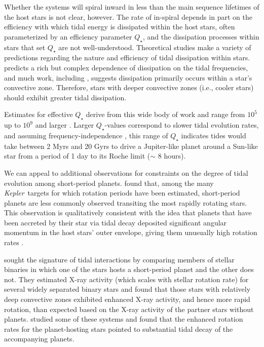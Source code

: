 \documentclass{svjour3}                     %
\newcommand{\kepler}{\emph{Kepler}}
\begin{document}
Whether the systems will spiral inward in less than the main sequence lifetimes of the host stars is not clear, however. The rate of in-spiral depends in part on the efficiency with which tidal energy is dissipated within the host stars, often parameterized by an efficiency parameter $Q_\star$, and the dissipation processes within stars that set $Q_\star$ are not well-understood. Theoretical studies make a variety of predictions regarding the nature and efficiency of tidal dissipation within stars. \cite{2016ApJ...816...18E} predicts a rich but complex dependence of dissipation on the tidal frequencies, and much work, including \cite{2007ApJ...655.1166P}, suggests dissipation primarily occurs within a star's convective zone. Therefore, stars with deeper convective zones (i.e., cooler stars) should exhibit greater tidal dissipation. 

Estimates for effective $Q_\star$ derive from this wide body of work and range from $10^5$ \cite{1996Natur.380..606L,2016ApJ...816...18E} up to $10^9$ and larger \cite{2011ApJ...731...67P}. Larger $Q_\star$-values correspond to slower tidal evolution rates, and assuming frequency-independence \cite{1966Icar....5..375G}, this range of $Q_\star$ indicates tides would take between 2 Myrs and 20 Gyrs to drive a Jupiter-like planet around a Sun-like star from a period of 1 day to its Roche limit ($\sim$ 8 hours).

We can appeal to additional observations for constraints on the degree of tidal evolution among short-period planets. \cite{2013ApJ...775L..11M} found that, among the many \kepler\ targets for which rotation periods have been estimated, short-period planets are less commonly observed transiting the most rapidly rotating stars. This observation is qualitatively consistent with the idea that planets that have been accreted by their star via tidal decay deposited significant angular momentum in the host stars' outer envelope, giving them unusually high rotation rates \cite{2009ApJ...698.1357J}. 

\cite{2014A&A...565L...1P} sought the signature of tidal interactions by comparing members of stellar binaries in which one of the stars hosts a short-period planet and the other does not. They estimated X-ray activity (which scales with stellar rotation rate) for several widely separated binary stars and found that those stars with relatively deep convective zones exhibited enhanced X-ray activity, and hence more rapid rotation, than expected based on the X-ray activity of the partner stars without planets. \cite{2015ApJ...807...78F} studied some of these systems and found that the enhanced rotation rates for the planet-hosting stars pointed to substantial tidal decay of the accompanying planets. 
\end{document}
